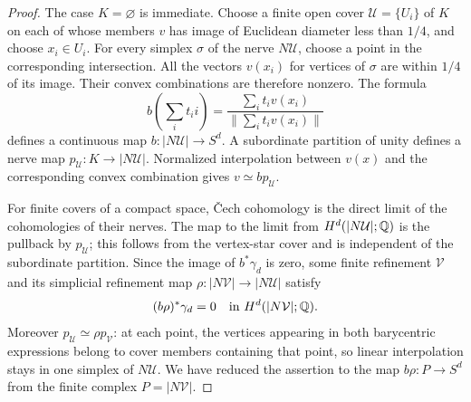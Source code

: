 \begin{proof}
The case $K=\varnothing$ is immediate.  Choose a finite open cover
$\mathcal U=\{U_i\}$ of $K$ on each of whose members $v$ has image
of Euclidean diameter less than $1/4$, and choose $x_i\in U_i$.
For every simplex $\sigma$ of the nerve $N\mathcal U$, choose a
point in the corresponding intersection.  All the vectors
$v(x_i)$ for vertices of $\sigma$ are within $1/4$ of its image.
Their convex combinations are therefore nonzero.  The formula
\[
 b\left(\sum_i t_i i\right)
    =\frac{\sum_i t_i v(x_i)}{\|\sum_i t_i v(x_i)\|}
\]
defines a continuous map $b:|N\mathcal U|\to S^d$.
A subordinate partition of unity defines a nerve map
$p_{\mathcal U}:K\to|N\mathcal U|$.  Normalized interpolation
between $v(x)$ and the corresponding convex combination gives
$v\simeq bp_{\mathcal U}$.

For finite covers of a compact space, \v Cech cohomology is the
direct limit of the cohomologies of their nerves.  The map to the
limit from $H^d(|N\mathcal U|;\mathbb Q)$ is the pullback by
$p_{\mathcal U}$; this follows from the vertex-star cover and is
independent of the subordinate partition.  Since the image of
$b^*\gamma_d$ is zero, some finite refinement $\mathcal V$ and its
simplicial refinement map
$\rho:|N\mathcal V|\to|N\mathcal U|$ satisfy
\[
 (b\rho)^*\gamma_d=0\quad\hbox{in }H^d(|N\mathcal V|;\mathbb Q).
\]
Moreover $p_{\mathcal U}\simeq\rho p_{\mathcal V}$: at each
point, the vertices appearing in both barycentric expressions
belong to cover members containing that point, so linear
interpolation stays in one simplex of $N\mathcal U$.  We have
reduced the assertion to the map
$b\rho:P\to S^d$ from the finite complex $P=|N\mathcal V|$.


\end{proof}
